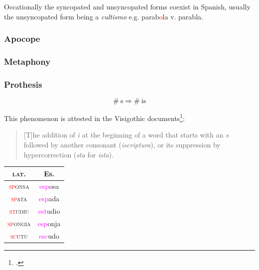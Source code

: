 \documentclass{report}[12pt]
\begin{document}
Occationally the syncopated and unsyncopated forms coexist in Spanish, usually the unsyncopated form being a \emph{cultismo} e.g. parab\textcolor{red}{o}la v. parabla. \\

\subsubsection{Apocope}

\begin{tcolorbox}

\end{tcolorbox}

\subsubsection{Metaphony}

\begin{tcolorbox}

\end{tcolorbox}

\subsubsection{Prothesis}

\begin{tcolorbox}
  \[ \#\ \text{s} \Rightarrow \#\ \text{is} \]
\end{tcolorbox}

This phenomenon is attested in the Visigothic documents\footcite[p.~159]{latin_palaeography}:
\begin{quote}
  [T]he addition of \emph{i} at the beginning of a word that starts with an \emph{s} followed by another consonant (\emph{iscriptura}), or its suppression by hypercorrection (\emph{sta} for \emph{ista}).
\end{quote}

\begin{tabular}{c c}
  \textsc{lat.} & Es. \\
  \hline
  \textsc{\textcolor{red}{sp}onsa} & \textcolor{magenta}{esp}osa \\
  \textsc{\textcolor{red}{sp}ata} & \textcolor{magenta}{esp}ada \\
  \textsc{\textcolor{red}{st}udiu} & \textcolor{magenta}{est}udio \\
  \textsc{\textcolor{red}{sp}ongia} & \textcolor{magenta}{esp}onja \\
  \textsc{\textcolor{red}{sc}utu} & \textcolor{magenta}{esc}udo \\
\end{tabular}
\end{document}
